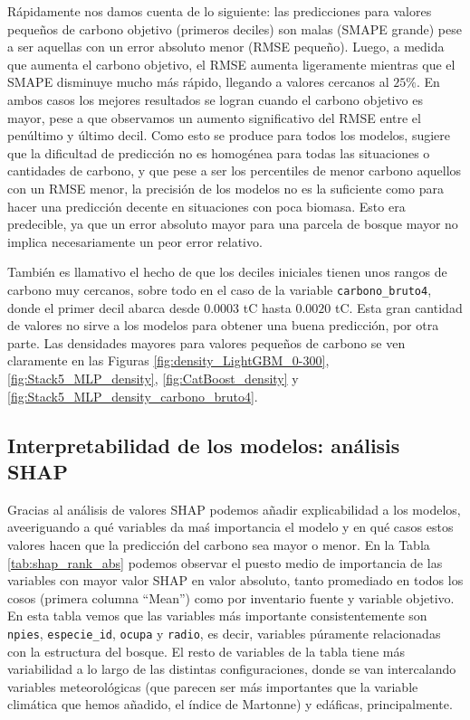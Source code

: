 Rápidamente nos damos cuenta de lo siguiente: las predicciones para valores pequeños de carbono objetivo (primeros deciles) son malas (SMAPE grande) pese a ser aquellas con un error absoluto menor (RMSE pequeño). Luego, a medida que aumenta el carbono objetivo, el RMSE aumenta ligeramente mientras que el SMAPE disminuye mucho más rápido, llegando a valores cercanos al $25\%$. En ambos casos los mejores resultados se logran cuando el carbono objetivo es mayor, pese a que observamos un aumento significativo del RMSE entre el penúltimo y último decil. Como esto se produce para todos los modelos, sugiere que la dificultad de predicción no es homogénea para todas las situaciones o cantidades de carbono, y que pese a ser los percentiles de menor carbono aquellos con un RMSE menor, la precisión de los modelos no es la suficiente como para hacer una predicción decente en situaciones con poca biomasa. Esto era predecible, ya que un error absoluto mayor para una parcela de bosque mayor no implica necesariamente un peor error relativo.

También es llamativo el hecho de que los deciles iniciales tienen unos rangos de carbono muy cercanos, sobre todo en el caso de la variable \texttt{carbono\_bruto4}, donde el primer decil abarca desde $0.0003$ tC hasta $0.0020$ tC. Esta gran cantidad de valores no sirve a los modelos para obtener una buena predicción, por otra parte. Las densidades mayores para valores pequeños de carbono se ven claramente en las Figuras \ref{fig:density_LightGBM_0-300}, \ref{fig:Stack5_MLP_density}, \ref{fig:CatBoost_density} y \ref{fig:Stack5_MLP_density_carbono_bruto4}.

\subsection{Interpretabilidad de los modelos: análisis SHAP}
\label{sec:interpretabilidad_shap}

Gracias al análisis de valores SHAP podemos añadir explicabilidad a los modelos, aveeriguando a qué variables da maś importancia el modelo y en qué casos estos valores hacen que la predicción del carbono sea mayor o menor. En la Tabla \ref{tab:shap_rank_abs} podemos observar el puesto medio de importancia de las variables con mayor valor SHAP en valor absoluto, tanto promediado en todos los cosos (primera columna ``Mean'') como por inventario fuente y variable objetivo. En esta tabla vemos que las variables más importante consistentemente son \texttt{npies}, \texttt{especie\_id}, \texttt{ocupa} y \texttt{radio}, es decir, variables púramente relacionadas con la estructura del bosque. El resto de variables de la tabla tiene más variabilidad a lo largo de las distintas configuraciones, donde se van intercalando variables meteorológicas (que parecen ser más importantes que la variable climática que hemos añadido, el índice de Martonne) y edáficas, principalmente. 

